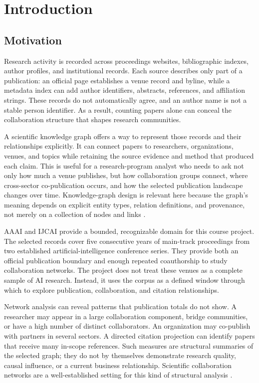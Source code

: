 \chapter{Introduction}

\section{Motivation}

Research activity is recorded across proceedings websites, bibliographic indexes,
author profiles, and institutional records. Each source describes only part of a
publication: an official page establishes a venue record and byline, while a
metadata index can add author identifiers, abstracts, references, and affiliation
strings. These records do not automatically agree, and an author name is not a
stable person identifier. As a result, counting papers alone can conceal the
collaboration structure that shapes research communities.

A scientific knowledge graph offers a way to represent those records and their
relationships explicitly. It can connect papers to researchers, organizations,
venues, and topics while retaining the source evidence and method that produced
each claim. This is useful for a research-program analyst who needs to ask not
only how much a venue publishes, but how collaboration groups connect, where
cross-sector co-publication occurs, and how the selected publication landscape
changes over time. Knowledge-graph design is relevant here because the graph's
meaning depends on explicit entity types, relation definitions, and provenance,
not merely on a collection of nodes and links \citep{hogan2022knowledgegraphs}.

AAAI and IJCAI provide a bounded, recognizable domain for this course project.
The selected records cover five consecutive years of main-track proceedings from
two established artificial-intelligence conference series. They provide both an
official publication boundary and enough repeated coauthorship to study
collaboration networks. The project does not treat these venues as a complete
sample of AI research. Instead, it uses the corpus as a defined window through
which to explore publication, collaboration, and citation relationships.

Network analysis can reveal patterns that publication totals do not show. A
researcher may appear in a large collaboration component, bridge communities, or
have a high number of distinct collaborators. An organization may co-publish with
partners in several sectors. A directed citation projection can identify papers
that receive many in-scope references. Such measures are structural summaries of
the selected graph; they do not by themselves demonstrate research quality,
causal influence, or a current business relationship. Scientific collaboration
networks are a well-established setting for this kind of structural analysis
\citep{newman2001collaboration}.

